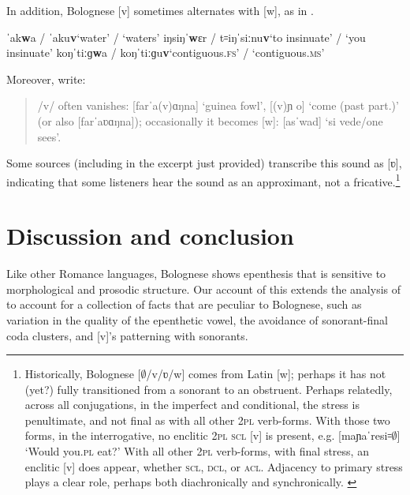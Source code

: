 \documentclass[output=paper,colorlinks,citecolor=brown]{langscibook}
\begin{document}
In addition, Bolognese [v] sometimes alternates with [w], as in .

\begin{exe}
    \ex \label{vw}
        \begin{xlist}
            \ex ˈak\textbf{w}a / ˈaku\textbf{v}\tab `water' / `waters'
            \ex iŋsiŋˈ\textbf{w}ɛr / t꞊iŋˈsiːnu\textbf{v}\tab `to insinuate' / `you insinuate'
            \ex koŋˈtiːɡ\textbf{w}a / koŋˈtiːɡu\textbf{v}\tab `contiguous.\textsc{fs}' / `contiguous.\textsc{ms}'
        \end{xlist}
\end{exe}

\noindent

Moreover, \citet[148]{caneparivitali:bolognese} write:

\begin{quote}
/v/ often vanishes: [farˈa(v)ɑŋna] `guinea fowl', [(v)ɲ o] `come (past part.)' (or also [farˈaʋɑŋna]); occasionally it becomes [w]: [asˈwad] `si vede/one sees'.
\end{quote}
Some sources (including \citeauthor{caneparivitali:bolognese} in the excerpt just provided) transcribe this sound as [ʋ], indicating that some listeners hear the sound as an approximant, not a fricative.\footnote{Historically, Bolognese [$\emptyset$/v/ʋ/w] comes from Latin [w]; perhaps it has not (yet?) fully transitioned from a sonorant to an obstruent. Perhaps relatedly, across all conjugations, in the imperfect and conditional, the stress is penultimate, and not final as with all other 2\textsc{pl} verb-forms. With those two forms, in the interrogative, no enclitic 2\textsc{pl} \textsc{scl} [v] is present, e.g. [maɲaˈresi꞊$\emptyset$] `Would you.\textsc{pl} eat?' With all other 2\textsc{pl} verb-forms, with final stress, an enclitic [v] does appear, whether \textsc{scl}, \textsc{dcl}, or \textsc{acl}. Adjacency to primary stress plays a clear role, perhaps both diachronically and synchronically. \label{historicalfootnote}}

\section{Discussion and conclusion}


Like other Romance languages, Bolognese shows epenthesis that is sensitive to morphological and prosodic structure.  Our account of this extends the analysis of \citet{cardinalettirepetti:clitics} to account for a collection of facts that are peculiar to Bolognese, such as variation in the quality of the epenthetic vowel, the avoidance of sonorant-final coda clusters, and [v]'s patterning with sonorants.
\end{document}
